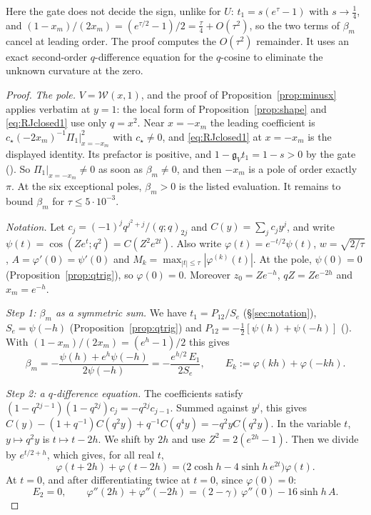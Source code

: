 \documentclass[11pt]{article}
\theoremstyle{plain}
\theoremstyle{definition}
\theoremstyle{remark}
\theoremstyle{plain}\newtheorem*{maintheorem}{Main Theorem}
\begin{document}
\noindent Here the gate does not decide the sign, unlike for $U$: $t_1=s(e^\tau-1)$ with
$s\to\tfrac14$, and $(1-x_m)/(2x_m)=(e^{\tau/2}-1)/2=\tfrac\tau4+O(\tau^2)$, so the two terms of
$\beta_m$ cancel at leading order. The proof computes the $O(\tau^2)$ remainder. It uses an exact
second-order $q$-difference equation for the $q$-cosine to eliminate the unknown curvature at
the zero.

\begin{proof}
\emph{The pole.} $V=\mathcal W(x,1)$, and the proof of Proposition~\ref{prop:minusx} applies
verbatim at $y=1$: the local form of Proposition~\ref{prop:shape} and \eqref{eq:RJclosed1} use only
$q=x^2$. Near $x=-x_m$ the leading coefficient is $c_\star(-2x_m)^{-1}\Pi_1|_{x=-x_m}^2$ with
$c_\star\ne0$, and \eqref{eq:RJclosed1} at $x=-x_m$ is the displayed identity. Its prefactor is
positive, and $1-\mathfrak g_Vt_1=1-s>0$ by the gate
({\cite[Corollary ``the gate closes'', \textup{app:gate}]{Bonfioli2026bB}}). So $\Pi_1|_{x=-x_m}\ne0$ as soon as $\beta_m\ne0$, and
then $-x_m$ is a pole of order exactly $\pi$. At the six exceptional poles, $\beta_m>0$ is the
listed evaluation. It remains to bound $\beta_m$ for $\tau\le5\cdot10^{-3}$.

\emph{Notation.} Let $c_j=(-1)^jq^{j^2+j}/(q;q)_{2j}$ and $C(y)=\sum_jc_jy^j$, and write
$\psi(t)=\cos(Ze^t;q^2)=C(Z^2e^{2t})$. Also write $\varphi(t)=e^{-t/2}\psi(t)$,
$w=\sqrt{2/\tau}$, $A=\varphi'(0)=\psi'(0)$ and $M_k=\max_{|t|\le\tau}|\varphi^{(k)}(t)|$. At the
pole, $\psi(0)=0$ (Proposition~\ref{prop:qtrig}), so $\varphi(0)=0$. Moreover $z_0=Ze^{-h}$,
$qZ=Ze^{-2h}$ and $x_m=e^{-h}$.

\emph{Step 1: $\beta_m$ as a symmetric sum.} We have $t_1=P_{12}/S_e$ (\S\ref{sec:notation}),
$S_e=\psi(-h)$ (Proposition~\ref{prop:qtrig}) and $P_{12}=-\tfrac12[\psi(h)+\psi(-h)]$
({\cite[Proposition \textup{prop:P12second}]{Bonfioli2026bB}}). With $(1-x_m)/(2x_m)=(e^h-1)/2$ this gives
\begin{equation}\label{eq:betaE1}
   \beta_m=-\frac{\psi(h)+e^h\psi(-h)}{2\psi(-h)}=-\frac{e^{h/2}\,E_1}{2S_e},\qquad
   E_k:=\varphi(kh)+\varphi(-kh).
\end{equation}

\emph{Step 2: a $q$-difference equation.} The coefficients satisfy
$(1-q^{2j-1})(1-q^{2j})c_j=-q^{2j}c_{j-1}$. Summed against $y^j$, this gives
$C(y)-(1+q^{-1})C(q^2y)+q^{-1}C(q^4y)=-q^2yC(q^2y)$. In the variable $t$, $y\mapsto q^2y$ is
$t\mapsto t-2h$. We shift by $2h$ and use $Z^2=2(e^{2h}-1)$. Then we divide by $e^{t/2+h}$, which
gives, for all real $t$,
\begin{equation}\label{eq:chidiff}
   \varphi(t+2h)+\varphi(t-2h)=\bigl(2\cosh h-4\sinh h\,e^{2t}\bigr)\varphi(t).
\end{equation}
At $t=0$, and after differentiating twice at $t=0$, since $\varphi(0)=0$:
\begin{equation}\label{eq:chiat0}
   E_2=0,\qquad \varphi''(2h)+\varphi''(-2h)=(2-\gamma)\,\varphi''(0)-16\sinh h\,A .
\end{equation}


\end{proof}
\end{document}
